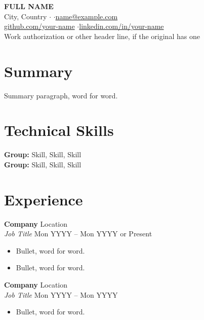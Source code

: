 \begin{center}
    {\LARGE \textbf{{{FULL NAME}}}} \\ \vspace{2pt}
    {{City, Country}} \quad$\cdot$ \quad$\cdot$\quad \href{mailto:name@example.com}{name@example.com} \\
    \href{https://github.com/your-name}{github.com/your-name} \quad$\cdot$\quad \href{https://www.linkedin.com/in/your-name}{linkedin.com/in/your-name} \\
    {{Work authorization or other header line, if the original has one}}
\end{center}

\section*{Summary}
{{Summary paragraph, word for word.}}

\section*{Technical Skills}
\textbf{{{Group}}:} {{Skill}}, {{Skill}}, {{Skill}} \\
\textbf{{{Group}}:} {{Skill}}, {{Skill}}, {{Skill}}

\section*{Experience}

\textbf{{{Company}}} \hfill {{Location}} \\
\textit{{{Job Title}}} \hfill {{Mon YYYY}} -- {{Mon YYYY or Present}}
\begin{itemize}
    \item {{Bullet, word for word.}}
    \item {{Bullet, word for word.}}
\end{itemize}

\vspace{6pt}
\textbf{{{Company}}} \hfill {{Location}} \\
\textit{{{Job Title}}} \hfill {{Mon YYYY}} -- {{Mon YYYY}}
\begin{itemize}
    \item {{Bullet, word for word.}}
\end{itemize}

